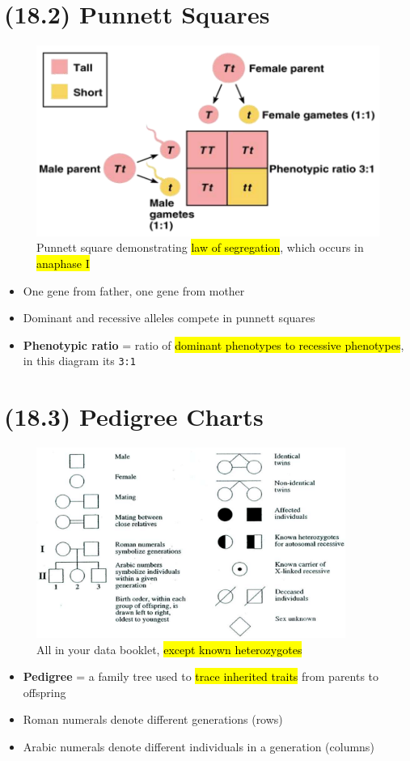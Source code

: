 \documentclass[a4paper,12pt]{article}
\begin{document}
\section{(18.2) Punnett Squares}
\begin{figure}[H]
    \centering
    \includegraphics[width=\textwidth]{punnett}
    \caption{Punnett square demonstrating \hl{law of segregation}, which occurs in \hl{anaphase I}}
\end{figure}
\begin{itemize}
    \item{One gene from father, one gene from mother}
    \item{Dominant and recessive alleles compete in punnett squares}
    \item{\textbf{Phenotypic ratio} = ratio of \hl{dominant phenotypes to recessive phenotypes}, in this diagram its \texttt{3:1}}
\end{itemize}

\section{(18.3) Pedigree Charts}
\begin{figure}[H]
    \centering
    \includegraphics[width=0.9\textwidth]{pedigree}
    \caption{All in your data booklet, \hl{except known heterozygotes}}
\end{figure}
\begin{itemize}
    \item{\textbf{Pedigree} = a family tree used to \hl{trace inherited traits} from parents to offspring}
    \item{Roman numerals denote different generations (rows)}
    \item{Arabic numerals denote different individuals in a generation (columns)}
\end{itemize}
\end{document}
